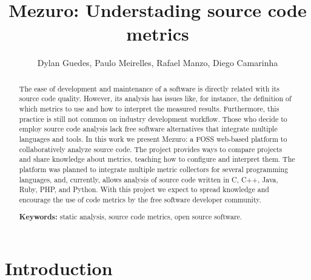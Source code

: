 \documentclass{llncs}
\begin{document}
\sloppy
\title{Mezuro: Understading source code metrics}

\author{Dylan Guedes, Paulo Meirelles,
        Rafael Manzo, Diego Camarinha}



\maketitle
\begin{abstract}
  The ease of development and maintenance of a software is directly related
with its source code quality.
  However, its analysis has issues like, for instance, the definition of which
metrics to use and how to interpret the measured results. Furthermore, this
practice is still not common on industry development workflow. Those who decide
to employ source code analysis lack free software alternatives that integrate
multiple languages and tools.
In this work we present Mezuro: a FOSS web-based platform to collaboratively
analyze source code. The project provides ways to compare projects and share
knowledge about metrics, teaching how to configure and interpret them. The
platform was planned to integrate multiple metric collectors for several
programming languages, and, currently, allows analysis of source code written
in C, C++, Java, Ruby, PHP, and Python.
    With this project we expect to spread knowledge and encourage the use of
code metrics by the free software developer community.

\textbf{Keywords:} static analysis, source code metrics, open source software.
\end{abstract}

\section{Introduction}
\label{sec:intro}
\end{document}
